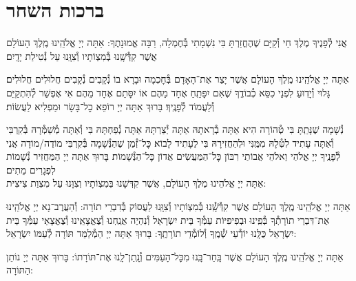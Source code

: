 \documentclass[twoside, openany, parskip=half, 11pt]{book}
\begin{document}
\vspace*{\fill}


\centerlast

\chapter[ברכות השחר]{ ברכות השחר }

\renewcommand{\thefootnote}{\roman{footnote}} %
\setlength{\parskip}{0.75em}

\newcommand{\na}{\begin{large}
‏‍ְ
\end{large}}

אֲנִי לְ֯פָנֶיךָ מֶלֶךְ חַי וְ֯קַיָּם שֶׁהֶחֱזַרְתָּ בִּי נִשְׁמָתִי בְּ֯חֶמְלָה, רַבָּה אֱמוּנָתֶךָ:
אַתָּה יְיָ אֱלֹהֵֽינוּ מֶֽלֶךְ הָעוֹלָם אֲשֶׁר קִדְּ֯שָֽׁנוּ בְּ֯מִצְוֹתָיו וְ֯צִוָּֽנוּ עַל נְ֯טִילַת יָדָֽיִם׃

אַתָּה יְיָ אֱלֹהֵֽינוּ מֶֽלֶךְ הָעוֹלָם אֲשֶׁר יָצַר אֶת־הָאָדָם בְּ֯חׇכְמָה וּבָרָא בוֹ נְ֯קָבִים נְ֯קָבִים חֲלוּלִים חֲלוּלִים׃ גָּלוּי וְ֯יָדֽוּעַ לִפְנֵי כִסֵּא כְ֯בוֹדֶֽךָ שֶׁאִם יִפָּתֵֽחַ אֶחָד מֵהֶם אוֹ יִסָּתֵם אֶחָד מֵהֶם אִי אֶפְשַׁר לְ֯הִתְקַיֵּם וְ֯לַעֲמוֹד לְ֯פָנֶֽיךָ׃ בָּרוּךְ אַתָּה יְיָ רוֹפֵא כׇל־בָּשָׂר וּמַפְלִיא לַעֲשׂוֹת׃


נְ֯שָׁמָה שֶׁנָּתַֽתָּ בִּי טְ֯הוֹרָה הִיא׃ אַתָּה בְ֯רָאתָהּ אַתָּה יְ֯צַרְתָּהּ אַתָּה נְ֯פַחְתָּהּ בִּי וְ֯אַתָּה מְ֯שַׁמְּ֯רָהּ בְּ֯קִרְבִּי וְ֯אַתָּה עָתִיד לִטְּ֯לָהּ מִמֶּֽנִּי וּלְהַחֲזִירָהּ בִּי לֶעָתִיד לָבוֹא׃ כׇּל־זְ֯מַן שֶׁהַנְּ֯שָׁמָה בְּ֯קִרְבִּי מוֹדֶה/מוֹדָה אֲנִי לְ֯פָנֶֽיךָ יְיָ אֱלֹהַי וֵאלֹהֵי אֲבוֹתַי רִבּוֹן כׇּל־הַמַּעֲשִׂים אֲדוֹן כׇּל־הַנְּ֯שָׁמוֹת׃ בָּרוּךְ אַתָּה יְיָ הַמַּחֲזִיר נְ֯שָׁמוֹת לִפְגָרִים מֵתִים׃\\
אַתָּה יְיָ אֱלֹהֵינוּ מֶלֶךְ הָעוֹלָם, אֲשֶׁר קִדְּשָׁנוּ בְּמִצְוֹתָיו וְצִוָּנוּ עַל מִצְוַת צִיצִית:

אַתָּה יְיָ אֱלֹהֵֽינוּ מֶֽלֶךְ הָעוֹלָם אֲשֶׁר קִדְּ֯שָֽׁ֯נוּ בְּ֯מִצְוֹתָיו וְ֯צִוָּֽנוּ לַעֲסוֹק בְּ֯דִבְרֵי תוֹרָה: וְ֯הַעֲרֶב־נָא יְיָ אֱלֹהֵֽינוּ אֶת־דִּבְרֵי תוֹרָתְ֯ךָ בְּ֯פִֽינוּ וּבְפִיפִיּוֹת עַמְּ֯ךָ בֵּית יִשְׂרָאֵל וְ֯נִהְיֶה אֲנַֽחְנוּ וְ֯צֶאֱצָאֵֽינוּ וְ֯צֶאֱצָאֵי עַמְּ֯ךָ בֵּית יִשְׂרָאֵל כֻּלָּֽנוּ יוֹדְ֯עֵי שְׁ֯מֶֽךָ וְ֯לוֹמְ֯דֵי תוֹרָתֶֽךָ: בָּרוּךְ אַתָּה יְיָ הַמְ֯לַמֵּד תּוֹרָה לְ֯עַמּוֹ יִשְׂרָאֵל:

אַתָּה יְיָ אֱלֹהֵֽינוּ מֶֽלֶךְ הָעוֹלָם אֲשֶׁר בָּֽחַר־בָּֽנוּ מִכׇּל־הָעַמִּים וְ֯נָֽתַן־לָֽנוּ אֶת־תּוֹרָתוֹ: בָּרוּךְ אַתָּה יְיָ נוֹתֵן הַתּוֹרָה:
\end{document}
